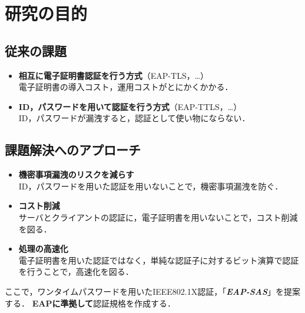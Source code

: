 \section{研究の目的}
\toc
\subsection{従来の課題}
\begin{frame}{\ft}
    \begin{alertblock}{}
        \begin{itemize}
            \setlength{\itemsep}{1em}
            \item \textbf{相互に電子証明書認証を行う方式}（EAP-TLS，\dots）\\\vspace{.5em}
                  電子証明書の導入コスト，運用コストがとにかくかかる．
            \item \textbf{ID，パスワードを用いて認証を行う方式}（EAP-TTLS，\dots）\\\vspace{.5em}
                  ID，パスワードが漏洩すると，認証として使い物にならない．
        \end{itemize}
    \end{alertblock}
\end{frame}
\subsection{課題解決へのアプローチ}
\begin{frame}{\ft}
    \begin{exampleblock}{}
        \begin{itemize}
            \setlength{\itemsep}{1em}
            \item \textbf{機密事項漏洩のリスクを減らす}\\
                  ID，パスワードを用いた認証を用いないことで，機密事項漏洩を防ぐ．
            \item \textbf{コスト削減}\\
                  サーバとクライアントの認証に，電子証明書を用いないことで，コスト削減を図る．
            \item \textbf{処理の高速化}\\
                  電子証明書を用いた認証ではなく，単純な認証子に対するビット演算で認証を行うことで，高速化を図る．
        \end{itemize}
    \end{exampleblock}
    ここで，ワンタイムパスワードを用いたIEEE802.1X認証，「\textit{\bfseries EAP-SAS}」を提案する．
    \textbf{\color{red}EAPに準拠して}認証規格を作成する．
\end{frame}